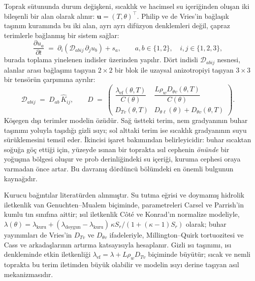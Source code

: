 \documentclass[11pt,a4paper]{article}
\newcommand{\bu}{\mathbf{u}}
\begin{document}
Toprak sütununda durum değişkeni, sıcaklık ve hacimsel su içeriğinden oluşan
iki bileşenli bir alan olarak alınır: $\bu = (T,\theta)^{\!\top}$. Philip ve
de Vries'in bağlaşık taşınım kuramında bu iki alan, ayrı ayrı difüzyon
denklemleri değil, çapraz terimlerle bağlanmış bir sistem sağlar:
\begin{equation}
\frac{\partial u_a}{\partial t}
   \;=\; \partial_i\!\left( \mathcal{D}_{abij}\,\partial_j u_b \right) + s_a ,
\qquad a,b\in\{1,2\},\quad i,j\in\{1,2,3\},
\label{eq:coupled}
\end{equation}
burada toplama yinelenen indisler üzerinden yapılır. Dört indisli
$\mathcal{D}_{abij}$ nesnesi, alanlar arası bağlaşımı taşıyan $2\times2$ bir
blok ile uzaysal anizotropiyi taşıyan $3\times3$ bir tensörün çarpımına ayrılır:
\begin{equation}
\mathcal{D}_{abij} \;=\; D_{ab}\,\hat{K}_{ij},
\qquad
D \;=\;
\begin{pmatrix}
\dfrac{\lambda_{\mathrm{ef}}(\theta,T)}{C(\theta)} &
\dfrac{L\rho_w D_{\theta v}(\theta,T)}{C(\theta)}\\[1.1em]
D_{Tv}(\theta,T) & D_{\theta \ell}(\theta) + D_{\theta v}(\theta,T)
\end{pmatrix}.
\label{eq:Dblock}
\end{equation}
Köşegen dışı terimler modelin özüdür. Sağ üstteki terim, nem gradyanının
buhar taşınımı yoluyla taşıdığı gizli ısıyı; sol alttaki terim ise sıcaklık
gradyanının suyu sürüklemesini temsil eder. İkincisi işaret bakımından
belirleyicidir: buhar sıcaktan soğuğa göç ettiği için, yüzeyde ısınan bir
toprakta ısıl cephenin \emph{önünde} bir yoğuşma bölgesi oluşur ve prob
derinliğindeki su içeriği, kuruma cephesi oraya varmadan önce artar. Bu
davranış dördüncü bölümdeki en önemli bulgunun kaynağıdır.

Kurucu bağıntılar literatürden alınmıştır. Su tutma eğrisi ve doymamış
hidrolik iletkenlik van Genuchten--Mualem biçiminde, parametreleri Carsel ve
Parrish'in kumlu tın sınıfına aittir; ısıl iletkenlik Côté ve Konrad'ın
normalize modeliyle, $\lambda(\theta) = \lambda_{\mathrm{kuru}} +
(\lambda_{\mathrm{doygun}}-\lambda_{\mathrm{kuru}})\,\kappa S_r/(1+(\kappa-1)S_r)$
olarak; buhar yayınımları de Vries'in $D_{Tv}$ ve $D_{\theta v}$ ifadeleriyle,
Millington--Quirk tortuozitesi ve Cass ve arkadaşlarının artırma katsayısıyla
hesaplanır. Gizli ısı taşınımı, ısı denkleminde etkin iletkenliği
$\lambda_{\mathrm{ef}} = \lambda + L\rho_w D_{Tv}$ biçiminde büyütür; sıcak ve
nemli toprakta bu terim iletimden büyük olabilir ve modelin ısıyı derine
taşıyan asıl mekanizmasıdır.
\end{document}
